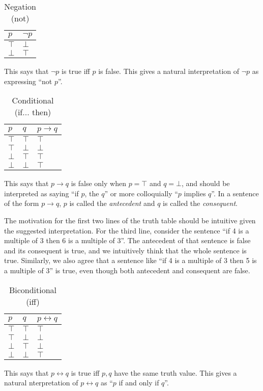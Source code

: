 \begin{table}[h!]
\centering
\caption{Negation (not)}
\label{my-label}
\begin{tabular}{l|l}
$p$     & $\lnot p$ \\ \hline 
$\top$  & $\bot$      \\
$\bot$  & $\top$    \\
\end{tabular}
\end{table}
This says that $\lnot p$ is true iff $p$ is false. This gives a natural interpretation of $\lnot p$ as expressing ``not $p$''.  

\begin{table}[h!]
\centering
\caption{Conditional (if... then)}
\label{my-label}
\begin{tabular}{l|l|l}
$p$    & $q$    & $p \rightarrow q$ \\ \hline
$\top$ & $\top$ & $\top$      \\
$\top$ & $\bot$ & $\bot$    \\
$\bot$ & $\top$ & $\top$    \\
$\bot$ & $\bot$ & $\top$    
\end{tabular}
\end{table}
This says that $p \rightarrow q$ is false only when $p = \top$ and $q = \bot$, and should be interpreted as saying ``if $p$, the $q$'' or more colloquially ``$p$ implies $q$''. In a sentence of the form $p \rightarrow q$, $p$ is called the \emph{antecedent} and $q$ is called the \emph{consequent}. 

The motivation for the first two lines of the truth table should be intuitive given the suggested interpretation. For the third line, consider the sentence ``if 4 is a multiple of 3 then 6 is a multiple of 3''. The antecedent of that sentence is false and its consequent is true, and we intuitively think that the whole sentence is true. Similarly, we also agree that a sentence like ``if 4 is a multiple of 3 then 5 is a multiple of 3'' is true, even though both antecedent and consequent are false. 

\begin{table}[h!]
\centering
\caption{Biconditional (iff)}
\label{my-label}
\begin{tabular}{l|l|l}
$p$    & $q$    & $p \leftrightarrow q$ \\ \hline
$\top$ & $\top$ & $\top$      \\
$\top$ & $\bot$ & $\bot$    \\
$\bot$ & $\top$ & $\bot$    \\
$\bot$ & $\bot$ & $\top$    
\end{tabular}
\end{table} 
This says that $p \leftrightarrow q$ is true iff $p, q$ have the same truth value. This gives a natural nterpretation of $p \leftrightarrow q$ as ``$p$ if and only if $q$''. 

